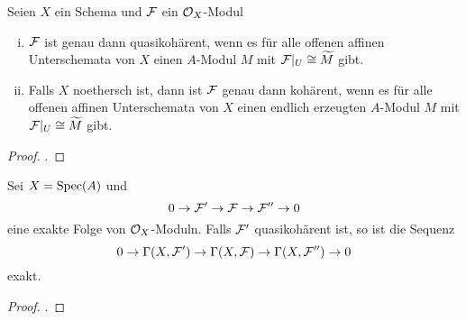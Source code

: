 \pagebreak[2]
\begin{prop}
\label{prop:9.8}
	Seien $X$ ein Schema und $\mathcal{F}$ ein $\mathcal{O}_X$-Modul
	\begin{enumerate}[i)]
		\item $\mathcal{F}$ ist genau dann quasikohärent, wenn es für alle offenen affinen Unterschemata von $X$ einen $A$-Modul $M$ mit $\mathcal{F}\vert_U \cong \widetilde{M}$ gibt.
		\item Falls $X$ noethersch ist, dann ist $\mathcal{F}$ genau dann kohärent, wenn es für alle offenen affinen Unterschemata von $X$ einen endlich erzeugten $A$-Modul $M$ mit $\mathcal{F}\vert_U \cong \widetilde{M}$ gibt.
	\end{enumerate}
	\begin{proof}
		\cite[Proposition~II.5.9]{hartshorne1977algebraic}.
	\end{proof}
\end{prop}

\begin{prop}
\label{prop:9.9}
	Sei $X=\operatorname{Spec}(A)$ und
	\[
		0 \to \mathcal{F}' \to \mathcal{F} \to \mathcal{F}'' \to 0
	\]
	eine exakte Folge von $\mathcal{O}_X$-Moduln. Falls $\mathcal{F}'$ quasikohärent ist, so ist die Sequenz
	\[
		0 \to \Gamma(X,\mathcal{F}') \to \Gamma(X,\mathcal{F}) \to \Gamma(X,\mathcal{F}'') \to 0	
	\]
	exakt.
	\begin{proof}
		\cite[Proposition~II.5.6]{hartshorne1977algebraic}.
	\end{proof}
\end{prop}

